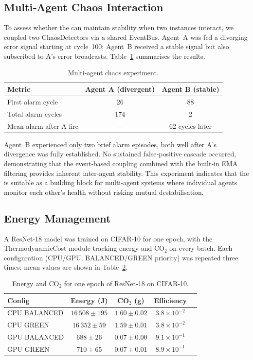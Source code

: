 \subsection{Multi‑Agent Chaos Interaction}

To assess whether the \Core{} can maintain stability when two instances
interact, we coupled two ChaosDetectors via a shared EventBus.
Agent~A was fed a diverging error signal starting at cycle~100;
Agent~B received a stable signal but also subscribed to A's error
broadcasts.  Table~\ref{tab:multiagent} summarises the results.

\begin{table}[htbp]
\centering
\caption{Multi‑agent chaos experiment.}
\label{tab:multiagent}
\begin{tabular}{l c c}
\toprule
\textbf{Metric} & \textbf{Agent A (divergent)} & \textbf{Agent B (stable)} \\
\midrule
First alarm cycle       & 26  & 88 \\
Total alarm cycles      & 174 & 2  \\
Mean alarm after A fire & --  & 62 cycles later \\
\bottomrule
\end{tabular}
\end{table}

Agent~B experienced only two brief alarm episodes, both well after A's
divergence was fully established.  No sustained false‑positive cascade
occurred, demonstrating that the event‑based coupling combined with
the built‑in EMA filtering provides inherent inter‑agent stability.
This experiment indicates that the \Core{} is suitable as a building
block for multi‑agent systems where individual agents monitor each
other's health without risking mutual destabilisation.

\subsection{Energy Management}

A ResNet‑18 model was trained on CIFAR‑10 for one epoch, with the
ThermodynamicCost module tracking energy and CO$_2$ on every batch.
Each configuration (CPU/GPU, BALANCED/GREEN priority) was repeated three
times; mean values are shown in Table~\ref{tab:energy}.

\begin{table}[htbp]
\centering
\caption{Energy and CO$_2$ for one epoch of ResNet‑18 on CIFAR‑10.}
\label{tab:energy}
\begin{tabular}{l c c c c}
\toprule
\textbf{Config} & \textbf{Energy (J)} & \textbf{CO$_2$ (g)} & \textbf{Efficiency} \\
\midrule
CPU BALANCED & $16\,508 \pm 195$ & $1.60 \pm 0.02$ & $3.8\times10^{-2}$ \\
CPU GREEN    & $16\,352 \pm 59$  & $1.59 \pm 0.01$ & $3.8\times10^{-2}$ \\
GPU BALANCED & $  688 \pm 26$   & $0.07 \pm 0.00$ & $9.1\times10^{-1}$ \\
GPU GREEN    & $  710 \pm 65$   & $0.07 \pm 0.01$ & $8.9\times10^{-1}$ \\
\bottomrule
\end{tabular}
\end{table}

